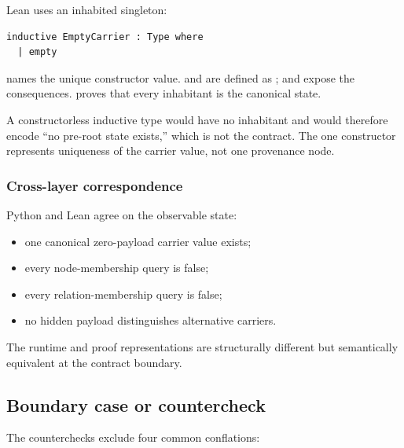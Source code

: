 Lean uses an inhabited singleton:

\begin{verbatim}
inductive EmptyCarrier : Type where
  | empty
\end{verbatim}

\texttt{\protect{}} names the unique constructor value.
\texttt{\protect{}} and \texttt{\protect{}} are defined as
\texttt{\protect{}}; \texttt{\protect{}} and \texttt{\protect{}} expose the
consequences. \texttt{\protect{}} proves that every inhabitant is the
canonical state.

A constructorless inductive type would have no inhabitant and would
therefore encode ``no pre-root state exists,'' which is not the
contract. The one constructor represents uniqueness of the carrier
value, not one provenance node.

\subsubsection{Cross-layer
correspondence}\label{cross-layer-correspondence-2}

Python and Lean agree on the observable state:

\begin{itemize}
\tightlist
\item
  one canonical zero-payload carrier value exists;
\item
  every node-membership query is false;
\item
  every relation-membership query is false;
\item
  no hidden payload distinguishes alternative carriers.
\end{itemize}

The runtime and proof representations are structurally different but
semantically equivalent at the contract boundary.

\subsection{Boundary case or
countercheck}\label{boundary-case-or-countercheck-2}

The counterchecks exclude four common conflations:

